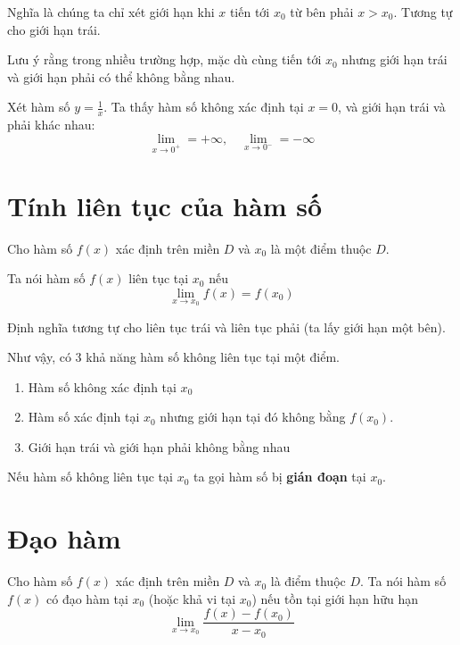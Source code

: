 Nghĩa là chúng ta chỉ xét giới hạn khi $x$ tiến tới $x_0$ từ bên phải $x > x_0$.
Tương tự cho giới hạn trái.

Lưu ý rằng trong nhiều trường hợp, mặc dù cùng tiến tới $x_0$ nhưng
giới hạn trái và giới hạn phải có thể không bằng nhau.

\begin{example}
    Xét hàm số $y = \frac{1}{x}$. Ta thấy hàm số không xác định
    tại $x = 0$, và giới hạn trái và phải khác nhau:
    \[\lim_{x \to 0^+} = +\infty, \quad \lim_{x \to 0^-} = -\infty\]
\end{example}

\section{Tính liên tục của hàm số}

Cho hàm số $f(x)$ xác định trên miền $D$ và $x_0$ là một điểm thuộc $D$.

\begin{definition}
    Ta nói hàm số $f(x)$ liên tục tại $x_0$ nếu
    \[\lim_{x \to x_0} f(x) = f(x_0)\]
\end{definition}

Định nghĩa tương tự cho liên tục trái và liên tục phải (ta lấy giới hạn một bên).

Như vậy, có 3 khả năng hàm số không liên tục tại một điểm.

\begin{enumerate}[noitemsep]
    \item Hàm số không xác định tại $x_0$
    \item Hàm số xác định tại $x_0$ nhưng giới hạn tại đó không bằng $f(x_0)$. 
    \item Giới hạn trái và giới hạn phải không bằng nhau
\end{enumerate}

Nếu hàm số không liên tục tại $x_0$ ta gọi hàm số bị \textbf{gián đoạn} tại $x_0$.

\section{Đạo hàm}

\begin{definition}
    Cho hàm số $f(x)$ xác định trên miền $D$ và $x_0$ là điểm thuộc $D$.
    Ta nói hàm số $f(x)$ có đạo hàm tại $x_0$ (hoặc khả vi tại $x_0$) nếu
    tồn tại giới hạn hữu hạn
    \[\lim_{x \to x_0}\frac{f(x) - f(x_0)}{x - x_0}\]
\end{definition}

